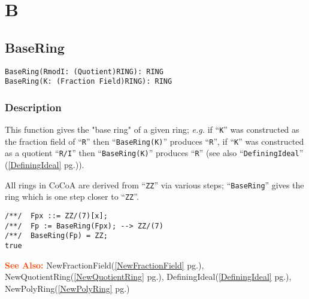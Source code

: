 \documentclass[a4paper]{mybook}
\newenvironment{command}{}{} %
\newcommand\SeeAlso{\par\textcolor{OrangeRed}{\textbf{\large See Also: }}}
\begin{document}
\chapter{B}  %
\label{B}

\section{BaseRing}
\label{BaseRing}
\begin{command} %


\begin{Verbatim}[label=syntax, rulecolor=\color{MidnightBlue},
frame=single]
BaseRing(RmodI: (Quotient)RING): RING
BaseRing(K: (Fraction Field)RING): RING
\end{Verbatim}


\subsection*{Description}

This function gives the "base ring" of a given ring; \textit{e.g.} if ``\verb&K&''
was constructed as the fraction field of ``\verb&R&'' then ``\verb&BaseRing(K)&''
produces ``\verb&R&'', if ``\verb&K&'' was constructed as a quotient ``\verb&R/I&'' then
``\verb&BaseRing(K)&'' produces ``\verb&R&'' (see also ``\verb&DefiningIdeal&'' (\ref{DefiningIdeal} pg.\pageref{DefiningIdeal})).
\par 
All rings in CoCoA are derived from ``\verb&ZZ&'' via various steps;
``\verb&BaseRing&'' gives the ring which is one step closer to ``\verb&ZZ&''.
\begin{Verbatim}[label=example, rulecolor=\color{PineGreen}, frame=single]
/**/  Fpx ::= ZZ/(7)[x];
/**/  Fp := BaseRing(Fpx); --> ZZ/(7)
/**/  BaseRing(Fp) = ZZ;
true
\end{Verbatim}


\SeeAlso %
  NewFractionField(\ref{NewFractionField} pg.\pageref{NewFractionField}), 
    NewQuotientRing(\ref{NewQuotientRing} pg.\pageref{NewQuotientRing}), 
    DefiningIdeal(\ref{DefiningIdeal} pg.\pageref{DefiningIdeal}), 
    NewPolyRing(\ref{NewPolyRing} pg.\pageref{NewPolyRing})
\end{command} %
\end{document}
